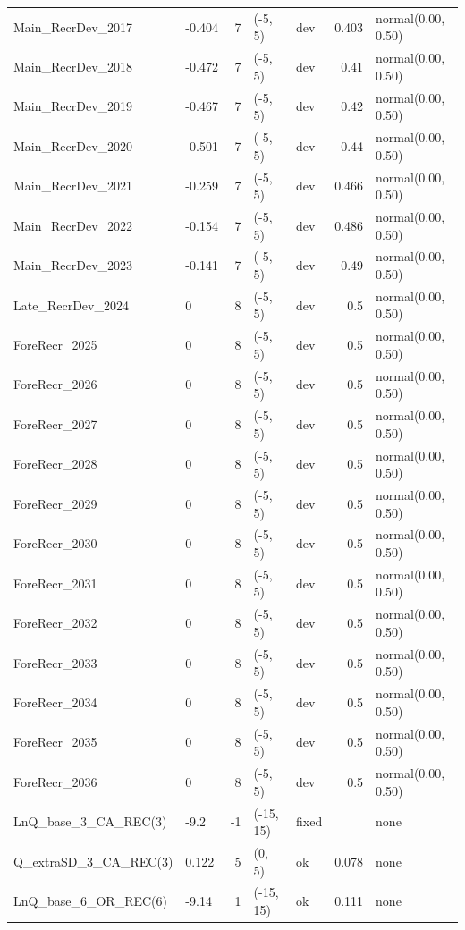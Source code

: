 \documentclass[
  english,
]{article}
\begin{document}
\begin{landscape}
\begin{longtable}{llrllrl}
Main\_RecrDev\_2017 & -0.404 & 7 & (-5, 5) & dev & 0.403 & normal(0.00, 0.50) \\ 
Main\_RecrDev\_2018 & -0.472 & 7 & (-5, 5) & dev & 0.41 & normal(0.00, 0.50) \\ 
Main\_RecrDev\_2019 & -0.467 & 7 & (-5, 5) & dev & 0.42 & normal(0.00, 0.50) \\ 
Main\_RecrDev\_2020 & -0.501 & 7 & (-5, 5) & dev & 0.44 & normal(0.00, 0.50) \\ 
Main\_RecrDev\_2021 & -0.259 & 7 & (-5, 5) & dev & 0.466 & normal(0.00, 0.50) \\ 
Main\_RecrDev\_2022 & -0.154 & 7 & (-5, 5) & dev & 0.486 & normal(0.00, 0.50) \\ 
Main\_RecrDev\_2023 & -0.141 & 7 & (-5, 5) & dev & 0.49 & normal(0.00, 0.50) \\ 
Late\_RecrDev\_2024 & 0 & 8 & (-5, 5) & dev & 0.5 & normal(0.00, 0.50) \\ 
ForeRecr\_2025 & 0 & 8 & (-5, 5) & dev & 0.5 & normal(0.00, 0.50) \\ 
ForeRecr\_2026 & 0 & 8 & (-5, 5) & dev & 0.5 & normal(0.00, 0.50) \\ 
ForeRecr\_2027 & 0 & 8 & (-5, 5) & dev & 0.5 & normal(0.00, 0.50) \\ 
ForeRecr\_2028 & 0 & 8 & (-5, 5) & dev & 0.5 & normal(0.00, 0.50) \\ 
ForeRecr\_2029 & 0 & 8 & (-5, 5) & dev & 0.5 & normal(0.00, 0.50) \\ 
ForeRecr\_2030 & 0 & 8 & (-5, 5) & dev & 0.5 & normal(0.00, 0.50) \\ 
ForeRecr\_2031 & 0 & 8 & (-5, 5) & dev & 0.5 & normal(0.00, 0.50) \\ 
ForeRecr\_2032 & 0 & 8 & (-5, 5) & dev & 0.5 & normal(0.00, 0.50) \\ 
ForeRecr\_2033 & 0 & 8 & (-5, 5) & dev & 0.5 & normal(0.00, 0.50) \\ 
ForeRecr\_2034 & 0 & 8 & (-5, 5) & dev & 0.5 & normal(0.00, 0.50) \\ 
ForeRecr\_2035 & 0 & 8 & (-5, 5) & dev & 0.5 & normal(0.00, 0.50) \\ 
ForeRecr\_2036 & 0 & 8 & (-5, 5) & dev & 0.5 & normal(0.00, 0.50) \\ 
LnQ\_base\_3\_CA\_REC(3) & -9.2 & -1 & (-15, 15) & fixed &  & none \\ 
Q\_extraSD\_3\_CA\_REC(3) & 0.122 & 5 & (0, 5) & ok & 0.078 & none \\ 
LnQ\_base\_6\_OR\_REC(6) & -9.14 & 1 & (-15, 15) & ok & 0.111 & none \\ 

\end{longtable}
\end{landscape}
\end{document}
